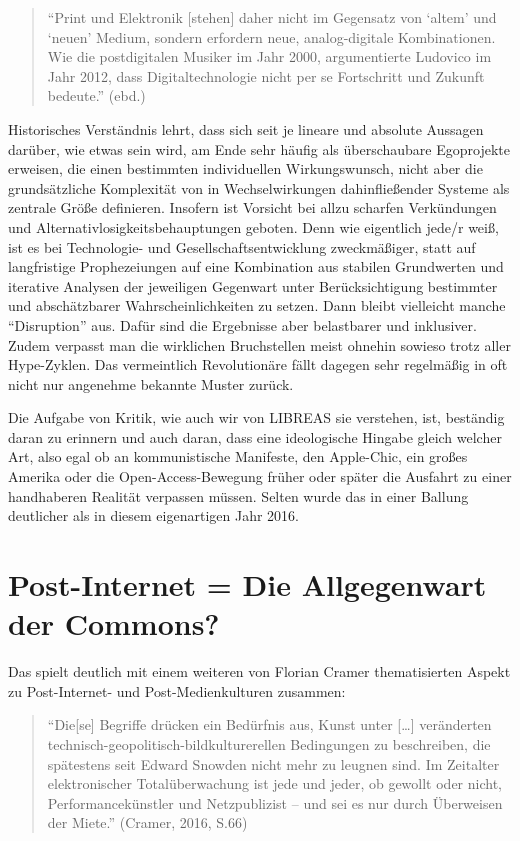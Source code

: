 \documentclass[a4paper,
fontsize=11pt,
oneside,
numbers=noperiodatend,
parskip=half-,
bibliography=totoc,
final
]{scrartcl}
\begin{document}
\begin{quote}
\enquote{Print und Elektronik {[}stehen{]} daher nicht im Gegensatz von
\enquote{altem} und \enquote{neuen} Medium, sondern erfordern neue,
analog-digitale Kombinationen. Wie die postdigitalen Musiker im Jahr
2000, argumentierte Ludovico im Jahr 2012, dass Digitaltechnologie nicht
per se Fortschritt und Zukunft bedeute.} (ebd.)
\end{quote}

Historisches Verständnis lehrt, dass sich seit je lineare und absolute
Aussagen darüber, wie etwas sein wird, am Ende sehr häufig als
überschaubare Egoprojekte erweisen, die einen bestimmten individuellen
Wirkungswunsch, nicht aber die grundsätzliche Komplexität von in
Wechselwirkungen dahinfließender Systeme als zentrale Größe definieren.
Insofern ist Vorsicht bei allzu scharfen Verkündungen und
Alternativlosigkeitsbehauptungen geboten. Denn wie eigentlich jede/r
weiß, ist es bei Technologie- und Gesellschaftsentwicklung zweckmäßiger,
statt auf langfristige Prophezeiungen auf eine Kombination aus stabilen
Grundwerten und iterative Analysen der jeweiligen Gegenwart unter
Berücksichtigung bestimmter und abschätzbarer Wahrscheinlichkeiten zu
setzen. Dann bleibt vielleicht manche \enquote{Disruption} aus. Dafür
sind die Ergebnisse aber belastbarer und inklusiver. Zudem verpasst man
die wirklichen Bruchstellen meist ohnehin sowieso trotz aller
Hype-Zyklen. Das vermeintlich Revolutionäre fällt dagegen sehr
regelmäßig in oft nicht nur angenehme bekannte Muster zurück.

Die Aufgabe von Kritik, wie auch wir von LIBREAS sie verstehen, ist,
beständig daran zu erinnern und auch daran, dass eine ideologische
Hingabe gleich welcher Art, also egal ob an kommunistische Manifeste,
den Apple-Chic, ein großes Amerika oder die Open-Access-Bewegung früher
oder später die Ausfahrt zu einer handhaberen Realität verpassen müssen.
Selten wurde das in einer Ballung deutlicher als in diesem eigenartigen
Jahr 2016.

\section*{Post-Internet = Die Allgegenwart der
Commons?}\label{post-internet-die-allgegenwart-der-commons}

Das spielt deutlich mit einem weiteren von Florian Cramer thematisierten
Aspekt zu Post-Internet- und Post-Medienkulturen zusammen:

\begin{quote}
\enquote{Die{[}se{]} Begriffe drücken ein Bedürfnis aus, Kunst unter
{[}\ldots{}{]} veränderten technisch-geopolitisch-bildkulturerellen
Bedingungen zu beschreiben, die spätestens seit Edward Snowden nicht
mehr zu leugnen sind. Im Zeitalter elektronischer Totalüberwachung ist
jede und jeder, ob gewollt oder nicht, Performancekünstler und
Netzpublizist -- und sei es nur durch Überweisen der Miete.} (Cramer,
2016, S.66)
\end{quote}
\end{document}
